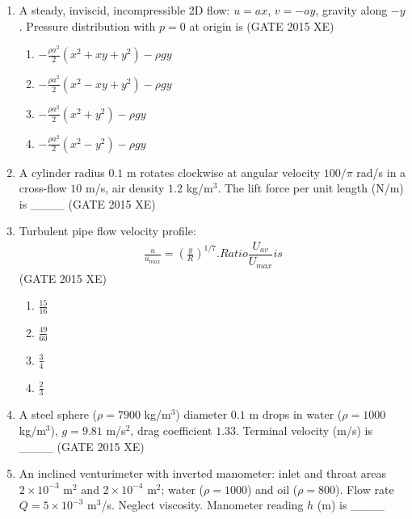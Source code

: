 \documentclass[journal,12pt,onecolumn]{IEEEtran}
\begin{document}
\begin{enumerate}
\item A steady, inviscid, incompressible 2D flow: $u = ax$, $v = -ay$, gravity along $-y$. Pressure distribution with $p=0$ at origin is
\hfill{(GATE 2015 XE)} \\

\begin{multicols}{2}
\begin{enumerate}
\item $-\frac{\rho a^2}{2}(x^2+xy+y^2) - \rho gy$
\item $-\frac{\rho a^2}{2}(x^2 - xy + y^2) - \rho gy$
\item $-\frac{\rho a^2}{2}(x^2+y^2) - \rho gy$
\item $-\frac{\rho a^2}{2}(x^2 - y^2) - \rho gy$
\end{enumerate}
\end{multicols}

\item A cylinder radius $0.1$ m rotates clockwise at angular velocity $100/\pi$ rad/s in a cross-flow $10$ m/s, air density $1.2$ kg/m$^3$. The lift force per unit length (N/m) is \_\_\_\_
\hfill{(GATE 2015 XE)} \\


\item Turbulent pipe flow velocity profile: 
\begin{align}
\displaystyle \frac{u}{u_{max}} = \left(\frac{y}{R}\right)^{1/7}. Ratio \dfrac{U_{av}}{U_{max}} is 
\end{align}
\hfill{(GATE 2015 XE)} 
\begin{multicols}{4}
\begin{enumerate}
\item $\frac{15}{16}$
\item $\frac{49}{60}$
\item $\frac{3}{4}$
\item $\frac{2}{3}$
\end{enumerate}
\end{multicols}

\item A steel sphere ($\rho=7900$ kg/m$^3$) diameter $0.1$ m drops in water ($\rho=1000$ kg/m$^3$), $g=9.81$ m/s$^2$, drag coefficient $1.33$. Terminal velocity (m/s) is \_\_\_\_
\hfill{(GATE 2015 XE)} \\

\newpage

\item An inclined venturimeter with inverted manometer: inlet and throat areas $2\times 10^{-3}$ m$^2$ and $2\times 10^{-4}$ m$^2$; water ($\rho=1000$) and oil ($\rho=800$). Flow rate $Q=5\times 10^{-3}$ m$^3$/s. Neglect viscosity. Manometer reading $h$ (m) is \_\_\_\_


\end{enumerate}
\end{document}
